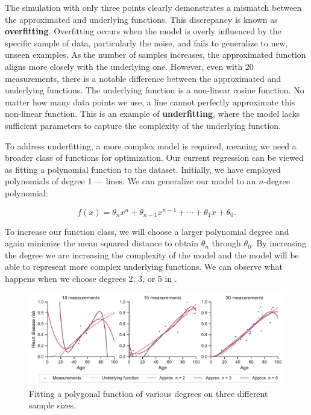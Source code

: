 The simulation with only three points clearly demonstrates a mismatch between the approximated and underlying functions. This discrepancy is known as \textbf{overfitting}. Overfitting occurs when the model is overly influenced by the specific sample of data, particularly the noise, and fails to generalize to new, unseen examples. As the number of samples increases, the approximated function aligns more closely with the underlying one. However, even with 20 measurements, there is a notable difference between the approximated and underlying functions. The underlying function is a non-linear cosine function. No matter how many data points we use, a line cannot perfectly approximate this non-linear function. This is an example of \textbf{underfitting}, where the model lacks sufficient parameters to capture the complexity of the underlying function.

To address underfitting, a more complex model is required, meaning we need a broader class of functions for optimization. Our current regression can be viewed as fitting a polynomial function to the dataset. Initially, we have employed polynomials of degree 1 — lines. We can generalize our model to an $n$-degree polynomial:

\begin{equation}
	f(x) = \theta_n x^n + \theta_{n-1}x^{n-1} + \cdots + \theta_1 x + \theta_0.
\end{equation}

To increase our function class, we will choose a larger polynomial degree and again minimize the mean squared distance to obtain $\theta_n$ through $\theta_0$. By increasing the degree we are increasing the complexity of the model and the model will be able to represent more complex underlying functions. We can observe what happens when we choose degrees 2, 3, or 5 in .

\begin{figure}[h]
 \centering
 \includegraphics[width=\columnwidth]{images/3/heart_disease_risk_samples_degrees}
 \caption{Fitting a polygonal function of various degrees on three different sample sizes.}
 \label{fig:reg-deg-2}
\end{figure}

